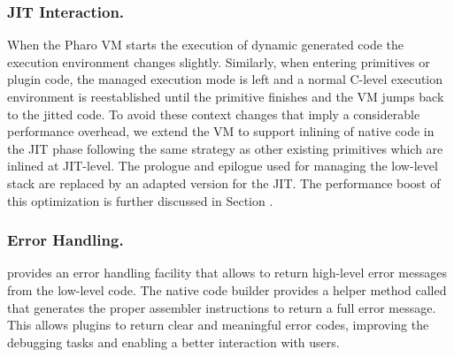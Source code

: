 \subsubsection{JIT Interaction.}

When the Pharo VM starts the execution of dynamic generated code the execution environment changes slightly.
Similarly, when entering primitives or plugin code, the managed execution mode is left and a normal C-level execution environment is reestablished until the primitive finishes and the VM jumps back to the jitted code. 
To avoid these context changes that imply a considerable performance overhead, we extend the VM to support inlining of native code in the JIT phase following the same strategy as other existing primitives which are inlined at JIT-level.
The \B prologue and epilogue used for managing the low-level stack are replaced by an adapted version for the JIT.
The performance boost of this optimization is further discussed in Section .

\subsubsection{Error Handling.}

\B provides an error handling facility that allows to return high-level error messages from the low-level code. 
The native code builder provides a helper method called  
that generates the proper assembler instructions to return a full error message.
This allows plugins to return clear and meaningful error codes, improving the debugging tasks and enabling a better interaction with users.




